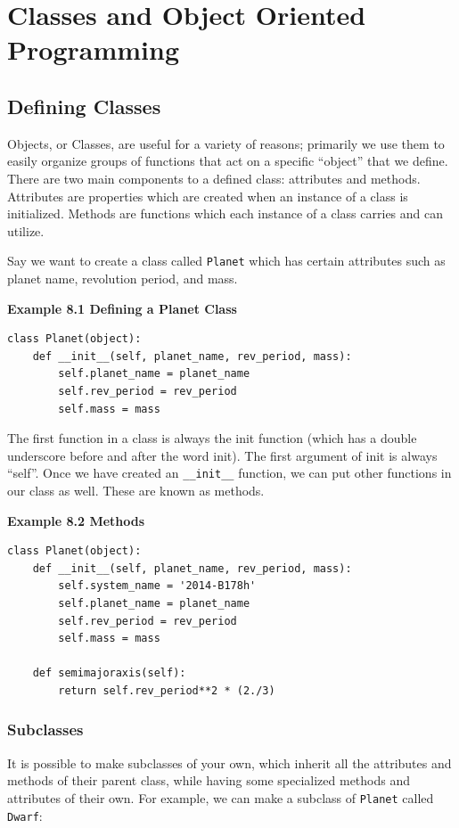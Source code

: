 
\chapter{Classes and Object Oriented Programming} %

\section{Defining Classes} %
Objects, or Classes, are useful for a variety of reasons; primarily we use them to easily organize groups of functions that act on a specific ``object'' that we define. %
There are two main components to a defined class: attributes and methods. %
Attributes are properties which are created when an instance of a class is initialized. %
Methods are functions which each instance of a class carries and can utilize. %

Say we want to create a class called \texttt{Planet} which has certain attributes such as planet name, revolution period, and mass. %

\textbf{Example 8.1 Defining a Planet Class} %
\begin{lstlisting}
class Planet(object):
    def __init__(self, planet_name, rev_period, mass):
        self.planet_name = planet_name
        self.rev_period = rev_period
        self.mass = mass
\end{lstlisting} %

The first function in a class is always the init function (which has a double underscore before and after the word init). %
The first argument of init is always ``self''. %
Once we have created an \texttt{\_\_init\_\_} function, we can put other functions in our class as well. %
These are known as methods. %

\textbf{Example 8.2 Methods} %
\begin{lstlisting}
class Planet(object):
    def __init__(self, planet_name, rev_period, mass):
        self.system_name = '2014-B178h'
        self.planet_name = planet_name
        self.rev_period = rev_period
        self.mass = mass

    def semimajoraxis(self):
        return self.rev_period**2 * (2./3)
\end{lstlisting} %

\subsection{Subclasses} %
It is possible to make subclasses of your own, which inherit all the attributes and methods of their parent class, while having some specialized methods and attributes of their own. %
For example, we can make a subclass of \texttt{Planet} called \texttt{Dwarf}: %

